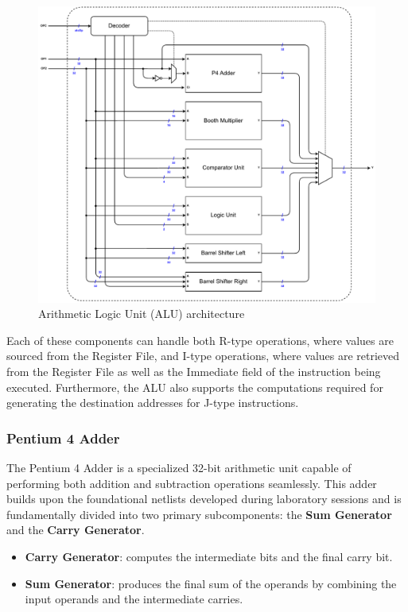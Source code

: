 \begin{figure}[!htbp]
    \centering
    \includegraphics[width=1\textwidth]{source/figures/alu.pdf}
    \caption{Arithmetic Logic Unit (ALU) architecture}
    \label{fig:alu}
\end{figure}

Each of these components can handle both R-type operations, where values are sourced from the Register File, and I-type operations, where values are retrieved from the Register File as well as the Immediate field of the instruction being executed. Furthermore, the ALU also supports the computations required for generating the destination addresses for J-type instructions.

\subsubsection{Pentium 4 Adder}
The Pentium 4 Adder is a specialized 32-bit arithmetic unit capable of performing both addition and subtraction operations seamlessly. This adder builds upon the foundational netlists developed during laboratory sessions and is fundamentally divided into two primary subcomponents: the \textbf{Sum Generator} and the \textbf{Carry Generator}.

\begin{itemize}%
    \item \textbf{Carry Generator}: computes the intermediate bits and the final carry bit.
    \item \textbf{Sum Generator}: produces the final sum of the operands by combining the input operands and the intermediate carries.
\end{itemize}

